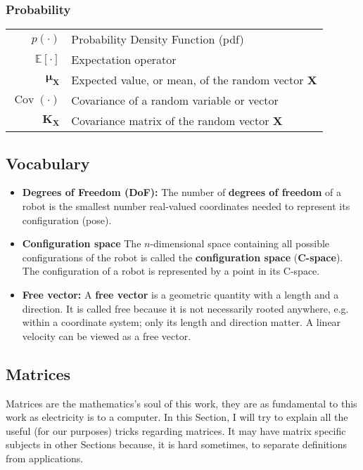 \documentclass[12pt]{article}
\newcommand{\mat}[1]{\boldsymbol{\mathbf{#1}}}
\newcommand{\brac}[1]{\left[#1\right]} %
\newcommand{\parentheses}[1]{\left(#1\right)}
\newcommand{\pr}[1]{p\parentheses{#1}}
\newcommand{\cov}[1]{\mathop{Cov}\parentheses{#1}}
\newcommand{\mb}[1]{{\boldsymbol{#1}}} %
\newcommand{\expv}[1]{\mathbb{E}\brac{#1}} %
\begin{document}
\subsubsection*{Probability}
\begin{table}[h]
    \centering
    \begin{tabularx}{\textwidth}{|rX|}
        \hline
         $\pr{\cdot}$ &     Probability Density Function (pdf) \\
         $\expv{\cdot}$ &   Expectation operator \\
         $\mb{\mu_X}$ &     Expected value, or mean, of the random vector $\mb{X}$ \\
         $\cov{\cdot}$ &    Covariance of a random variable or vector \\
         $\mat{K}_{\mb{X}}$ & Covariance matrix of the random vector $\mb{X}$
         \\ \hline
    \end{tabularx}
\end{table}

\subsection{Vocabulary}
\begin{itemize}
    \item \textbf{Degrees of Freedom (DoF):} The number of \textbf{degrees of freedom} of a robot is the smallest number real-valued coordinates needed to represent its configuration \cite{lynch2017modern} (pose).
    \item{\textbf{Configuration space}} The $n$-dimensional space containing all possible configurations of the robot is called the \textbf{configuration space} (\textbf{C-space}). The configuration of a robot is represented by a point in its C-space. \cite{lynch2017modern}
    \item{\textbf{Free vector:} A \textbf{free vector} is a geometric quantity with a length and a direction. It is called free because it is not necessarily rooted anywhere, e.g. within a coordinate system; only its length and direction matter. A linear velocity can be viewed as a free vector.}
\end{itemize}

\subsection{Matrices}
Matrices are the mathematics's soul of this work, they are as fundamental to this work as electricity is to a computer. In this Section, I will try to explain all the useful (for our purposes) tricks regarding matrices. It may have matrix specific subjects in other Sections because, it is hard sometimes, to separate definitions from applications.
\end{document}
